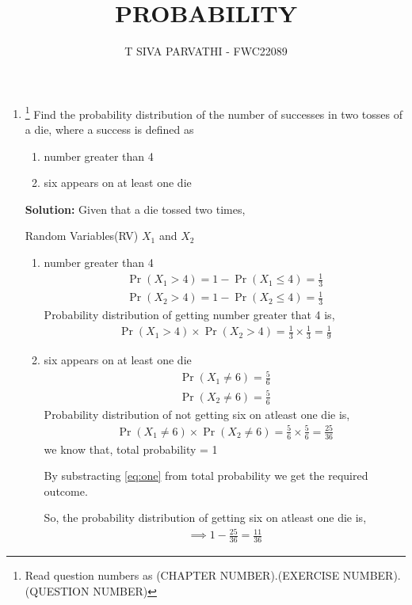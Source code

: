 \documentclass{article}
\providecommand{\pr}[1]{\ensuremath{\Pr\left(#1\right)}}
\newcommand{\solution}{\noindent \textbf{Solution: }}
\begin{document}
\title{PROBABILITY}
\author{\Large T SIVA PARVATHI - FWC22089}
\date{}

\maketitle
\begin{enumerate}[label=13.\arabic{enumi}.\arabic{enumii}]%
\setcounter{enumi}{3}
\setcounter{enumii}{5}

\item \footnote{Read question numbers as (CHAPTER NUMBER).(EXERCISE NUMBER).(QUESTION NUMBER)}
Find the probability distribution of the number of successes in two tosses of a die, where a success is defined as
\begin{enumerate}
\item number greater than 4
\item six appears on at least one die
\end{enumerate}

\solution
Given that a die tossed two times,
\begin{table}[h]\centering
	
	 \caption{Random Variables(RV) $X_1$ and $X_2$}\label{table:1}
\end{table}

\begin{enumerate}
\item number greater than 4
\begin{align}
\pr{X_1>4}=1-\pr{X_1\le4}=\frac{1}{3}\\
\pr{X_2>4}=1-\pr{X_2\le4}=\frac{1}{3}
\end{align}
Probability distribution of getting number greater that 4 is,
\begin{align}
\pr{X_1>4} \times \pr{X_2>4} = \frac{1}{3} \times \frac{1}{3}=\frac{1}{9}
\end{align}
\item six appears on at least one die
\begin{align}
\pr{X_1\neq6}=\frac{5}{6}\\
\pr{X_2\neq6}=\frac{5}{6}
\end{align}
Probability distribution of not getting six on atleast one die is, 
\begin{align}
\label{eq:one}
\pr{X_1\neq6} \times \pr{X_2\neq6} = \frac{5}{6} \times \frac{5}{6}=\frac{25}{36}
\end{align}
we know that, total probability = 1

By substracting \eqref{eq:one} from total probability we get the required outcome.
 
So, the probability distribution of getting six on atleast one die is,
\begin{align}
\implies 1-\frac{25}{36} = \frac{11}{36}
\end{align}
\end{enumerate}
\end{enumerate}
\end{document}
